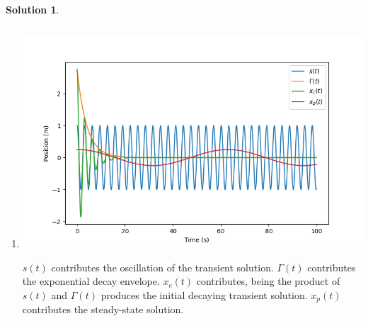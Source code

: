 \documentclass[10pt]{article}
\theoremstyle{definition}
\newtheorem{soln}{Solution}
\begin{document}
\begin{soln}
\begin{enumerate}[label=(\alph*)]
            \item \inputminted[breaklines, autogobble]{python3}{./python/q1/q1f.py}
                  \begin{center}
                        \includegraphics[scale=0.75]{Figure_3.png}
                  \end{center}
                  $s(t)$ contributes the oscillation of the transient solution. $\Gamma(t)$ contributes the exponential decay envelope. $x_c(t)$ contributes,
                  being the product of $s(t)$ and $\Gamma(t)$ produces the initial decaying transient solution. $x_p(t)$ contributes the steady-state solution.


\end{enumerate}
\end{soln}
\end{document}
